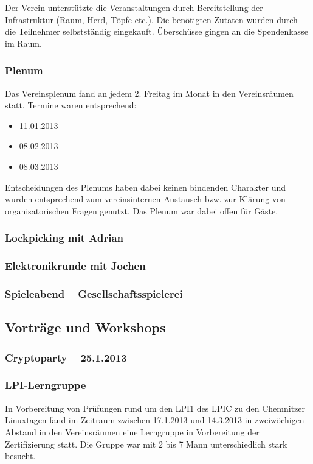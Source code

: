 \documentclass[10pt,DIV16]{scrartcl}
\begin{document}
Der Verein unterstützte die Veranstaltungen durch Bereitstellung der
Infrastruktur (Raum, Herd, Töpfe etc.). Die benötigten Zutaten
wurden durch die Teilnehmer selbstständig eingekauft. Überschüsse
gingen an die Spendenkasse im Raum.

\subsubsection{Plenum}

Das Vereinsplenum fand an jedem 2. Freitag im Monat in den
Vereinsräumen statt. Termine waren entsprechend:

\begin{itemize}
	\item 11.01.2013
	\item 08.02.2013
	\item 08.03.2013
\end{itemize}

Entscheidungen des Plenums haben dabei keinen bindenden Charakter
und wurden entsprechend zum vereinsinternen Austausch bzw. zur
Klärung von organisatorischen Fragen genutzt. Das Plenum war dabei
offen für Gäste.

\subsubsection{Lockpicking mit Adrian}

\subsubsection{Elektronikrunde mit Jochen}

\subsubsection{Spieleabend -- Gesellschaftsspielerei}
\subsection{Vorträge und Workshops}

\subsubsection{Cryptoparty -- 25.1.2013}

\subsubsection{LPI-Lerngruppe}

In Vorbereitung von Prüfungen rund um den LPI1 des LPIC zu den
Chemnitzer Linuxtagen fand im Zeitraum zwischen 17.1.2013 und
14.3.2013 in zweiwöchigen Abstand in den Vereinsräumen eine
Lerngruppe in Vorbereitung der Zertifizierung statt. Die Gruppe war
mit 2 bis 7 Mann unterschiedlich stark besucht.
\end{document}
